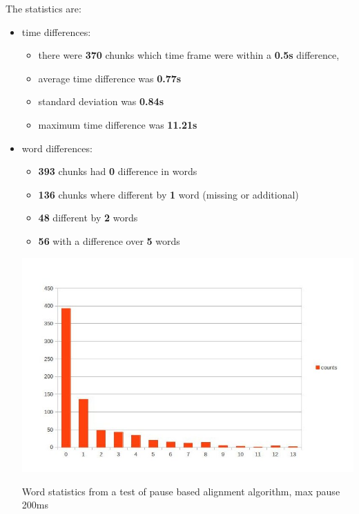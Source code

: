 \documentclass[12pt,a4paper,english]{article}
\begin{document}
The statistics are:
\begin{itemize}
    \item time differences:
    \begin{itemize}
        \item there were \textbf{370} chunks which time frame were within a \textbf{0.5s} difference, 
        \item average time difference was \textbf{0.77s}
        \item standard deviation was \textbf{0.84s}
        \item maximum time difference was \textbf{11.21s}
    \end{itemize}
    \item word differences:
    \begin{itemize}
        \item \textbf{393} chunks had \textbf{0} difference in words
        \item \textbf{136} chunks where different by \textbf{1} word (missing or additional)
        \item \textbf{48} different by \textbf{2} words
        \item \textbf{56} with a difference over \textbf{5} words
    \end{itemize}
    \begin{center}
        \includegraphics[scale=0.6]{length_based_results_better.jpg}
        \caption[]{Word statistics from a test of pause based alignment algorithm, max pause 200ms}
    \end {center}
\end{itemize}
\end{document}
